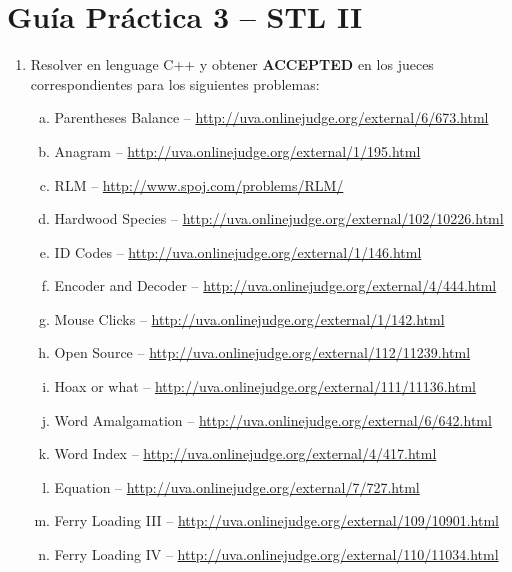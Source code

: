 




\section*{Gu\'ia Pr\'actica 3 -- STL II}

\begin{enumerate}[1 -]
	
	\item Resolver en lenguage C++ y obtener \textbf{ACCEPTED} en los jueces correspondientes para los siguientes problemas:
	
	\begin{enumerate}[a)]	
		\item Parentheses Balance -- \href{http://uva.onlinejudge.org/external/6/673.html}{http://uva.onlinejudge.org/external/6/673.html}
		\item Anagram -- \href{http://uva.onlinejudge.org/external/1/195.html}{http://uva.onlinejudge.org/external/1/195.html}
		\item RLM -- \href{http://www.spoj.com/problems/RLM/}{http://www.spoj.com/problems/RLM/}
		\item Hardwood Species -- \href{http://uva.onlinejudge.org/external/102/10226.html}{http://uva.onlinejudge.org/external/102/10226.html} 
		\item ID Codes -- \href{http://uva.onlinejudge.org/external/1/146.html}{http://uva.onlinejudge.org/external/1/146.html}
		\item Encoder and Decoder -- \href{http://uva.onlinejudge.org/external/4/444.html}{http://uva.onlinejudge.org/external/4/444.html}
		\item Mouse Clicks -- \href{http://uva.onlinejudge.org/external/1/142.html}{http://uva.onlinejudge.org/external/1/142.html}	
		\item Open Source -- \href{http://uva.onlinejudge.org/external/112/11239.html}{http://uva.onlinejudge.org/external/112/11239.html}	
		\item Hoax or what -- \href{http://uva.onlinejudge.org/external/111/11136.html}{http://uva.onlinejudge.org/external/111/11136.html}		
		\item Word Amalgamation -- \href{http://uva.onlinejudge.org/external/6/642.html}{http://uva.onlinejudge.org/external/6/642.html}
		\item Word Index -- \href{http://uva.onlinejudge.org/external/4/417.html}{http://uva.onlinejudge.org/external/4/417.html}
		\item Equation -- \href{http://uva.onlinejudge.org/external/7/727.html}{http://uva.onlinejudge.org/external/7/727.html}
		\item Ferry Loading III -- \href{http://uva.onlinejudge.org/external/109/10901.html}{http://uva.onlinejudge.org/external/109/10901.html}		
		\item Ferry Loading IV -- \href{http://uva.onlinejudge.org/external/110/11034.html}{http://uva.onlinejudge.org/external/110/11034.html}
	\end{enumerate}


\end{enumerate}


